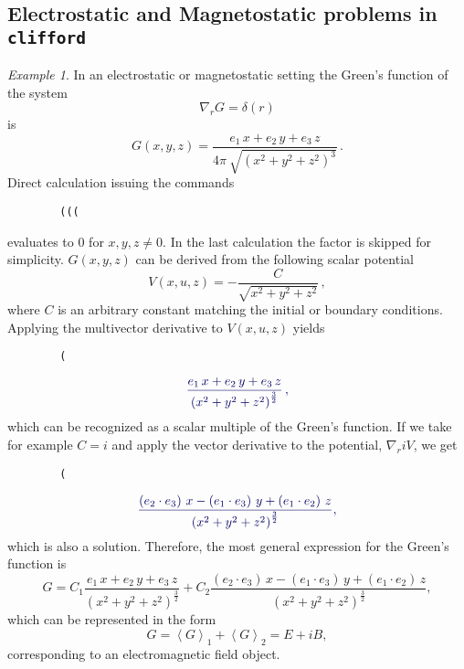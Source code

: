 \documentclass[twoside,reqno,11pt]{amsart}
\theoremstyle{definition}
\theoremstyle{remark}
\newtheorem*{ex}{Example}
\numberwithin{equation}{section}
\newcommand{\symb}[1]{{\tt #1}}
\newcommand {\grpart}[1]{\ensuremath{\left\langle #1 \right\rangle  }}
\begin{document}
\subsection{Electrostatic and Magnetostatic problems in \symb{clifford}}
\label{sec:static}
\begin{ex}
	In an electrostatic or magnetostatic setting the Green's function of the system
	\begin{equation}
	\nabla_r G = \delta\left( r\right)
	\end{equation}
	is
	\begin{equation}
	G \left(x,y,z \right)  =\frac{{{e}_{1}}\, x+{{e}_{2}}\, y+{{e}_{3}}\, z}{ 4 \pi \ \sqrt{{\left( {{x}^{2}}+{{y}^{2}}+{{z}^{2}}\right) }^{ 3 }}} \, .
	\end{equation}
	Direct calculation issuing the commands
	{\color{labelcolor}\begin{verbatim}
		(((\end{verbatim}}\noindent
	evaluates to  0  for $x,y,z\ne 0$.
	In the last calculation the factor is skipped for simplicity.
	$G \left(x,y,z \right)$ can be derived from the following scalar potential
	\begin{equation}
	V(x,u,z) = -\frac{C}{\sqrt{{{x}^{2}}+{{y}^{2}}+{{z}^{2}}}} \, ,
	\end{equation}
	where $C$ is an arbitrary constant matching the initial or boundary conditions.
	Applying the multivector derivative to $V(x,u,z)$ yields
	{\color{labelcolor}\begin{verbatim}
		(\end{verbatim}}
	\[\color{outputcolor}
	\frac{{{e}_{1}}\, x+{{e}_{2}}\, y+{{e}_{3}}\, z}{{{\left( {{x}^{2}}+{{y}^{2}}+{{z}^{2}}\right) }^{\frac{3}{2}}}} \, ,
	\]
	which can be recognized as a scalar multiple of the Green's function.
	If we take for example $C= i$ and apply the vector derivative to the potential, $\nabla_r  i V$, we get
	{\color{labelcolor}\begin{verbatim}
		(\end{verbatim}
	}
	\[\color{outputcolor}
	\frac{\left( {{e}_{2}}\cdot{{e}_{3}}\right) \, x-\left( {{e}_{1}}\cdot{{e}_{3}}\right) \, y+\left( {{e}_{1}}\cdot{{e}_{2}}\right) \, z}{{{\left( {{x}^{2}}+{{y}^{2}}+{{z}^{2}}\right) }^{\frac{3}{2}}}},
	\]
	which is also a solution.
	Therefore, the most general expression for the Green's function is
	\begin{equation}
	G = C_1 \frac{{{e}_{1}}\, x+{{e}_{2}}\, y+{{e}_{3}}\, z}{{{\left( {{x}^{2}}+{{y}^{2}}+{{z}^{2}}\right) }^{\frac{3}{2}}}}
	+ C_2 \frac{\left( {{e}_{2}}\cdot{{e}_{3}}\right) \, x-\left( {{e}_{1}}\cdot{{e}_{3}}\right) \, y+ \left( {{e}_{1}}\cdot{{e}_{2}}\right) \, z}{{{\left( {{x}^{2}}+{{y}^{2}}+{{z}^{2}}\right) }^{\frac{3}{2}}}},
	\end{equation}
	which can be represented in the form
\begin{equation}
	G = \grpart{ G }_1 + \grpart{ G }_2 = E + i  B,
\end{equation}
	corresponding to an electromagnetic field object.
\end{ex}
\end{document}
